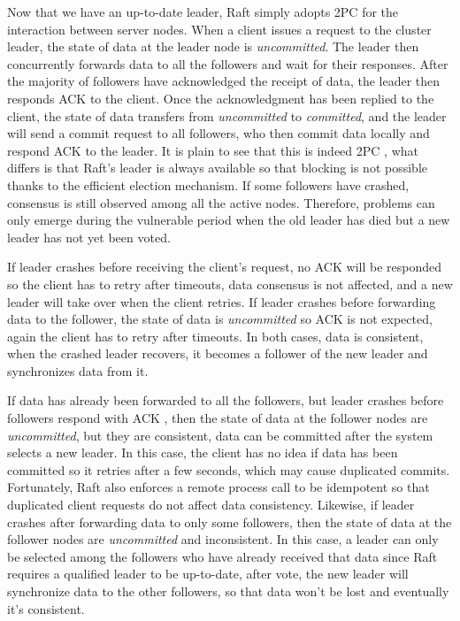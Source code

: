 \documentclass[11pt]{article}
\begin{document}
    Now that we have an up-to-date leader, Raft simply adopts \small{2PC} \normalsize for the interaction between server nodes. When a client issues a request to the cluster leader, the state of data at the leader node is \textit{uncommitted}. The leader then concurrently forwards data to all the followers and wait for their responses. After the majority of followers have acknowledged the receipt of data, the leader then responds \small{ACK} \normalsize to the client. Once the acknowledgment has been replied to the client, the state of data transfers from \textit{uncommitted} to \textit{committed}, and the leader will send a commit request to all followers, who then commit data locally and respond \small{ACK} \normalsize to the leader. It is plain to see that this is indeed \small{2PC} \normalsize, what differs is that Raft's leader is always available so that blocking is not possible thanks to the efficient election mechanism. If some followers have crashed, consensus is still observed among all the active nodes. Therefore, problems can only emerge during the vulnerable period when the old leader has died but a new leader has not yet been voted.

    If leader crashes before receiving the client's request, no \small{ACK} \normalsize will be responded so the client has to retry after timeouts, data consensus is not affected, and a new leader will take over when the client retries. If leader crashes before forwarding data to the follower, the state of data is \textit{uncommitted} so \small{ACK} \normalsize is not expected, again the client has to retry after timeouts. In both cases, data is consistent, when the crashed leader recovers, it becomes a follower of the new leader and synchronizes data from it.

    If data has already been forwarded to all the followers, but leader crashes before followers respond with \small{ACK} \normalsize, then the state of data at the follower nodes are \textit{uncommitted}, but they are consistent, data can be committed after the system selects a new leader. In this case, the client has no idea if data has been committed so it retries after a few seconds, which may cause duplicated commits. Fortunately, Raft also enforces a remote process call to be idempotent so that duplicated client requests do not affect data consistency. Likewise, if leader crashes after forwarding data to only some followers, then the state of data at the follower nodes are \textit{uncommitted} and inconsistent. In this case, a leader can only be selected among the followers who have already received that data since Raft requires a qualified leader to be up-to-date, after vote, the new leader will synchronize data to the other followers, so that data won't be lost and eventually it's consistent.
\end{document}

